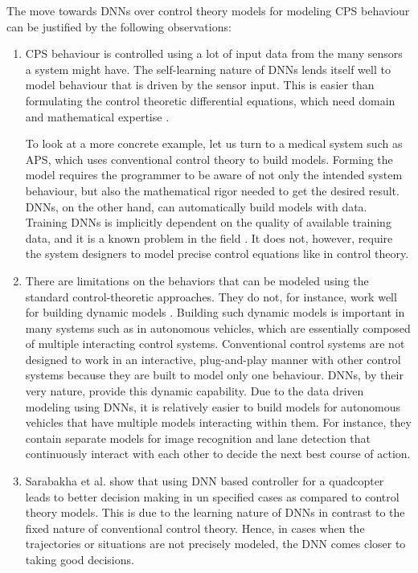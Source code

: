 The move towards DNNs over control theory models for modeling \ac{CPS} behaviour can be justified by the following observations:
\begin{enumerate}
	\item CPS behaviour is controlled using a lot of input data from the many sensors a system might have. The self-learning nature of DNNs lends itself well to model behaviour that is driven by the sensor input. This is easier than formulating the control theoretic differential equations, which need domain and mathematical expertise \cite{Aamir_2013}.
	
	
	To look at a more concrete example, let us turn to a medical system such as \ac{APS}, which uses conventional control theory to build models. 
	Forming the model requires the programmer to be aware of not only the intended system behaviour, but also the mathematical rigor needed to get the desired result. 
	DNNs, on the other hand, can automatically build models with data.
	Training DNNs is implicitly dependent on the quality of available training data, and it is a known problem in the field \cite{jabbar2015methods}. It does not, however, require the system designers to model precise control equations like in control theory.
	\item  There are limitations on the behaviors that can be modeled using the standard control-theoretic approaches. They do not, for instance, work well for building dynamic models \cite{article23}. Building such dynamic models is important in many systems such as in autonomous vehicles, which are essentially composed of multiple interacting control systems. Conventional control systems are not designed to work in an interactive, plug-and-play manner with other control systems because they are built to model only one behaviour. DNNs, by their very nature,  provide this dynamic capability. 
	Due to the data driven modeling using DNNs, it is relatively easier to build models for autonomous vehicles that have multiple models interacting within them.
	For instance, they contain separate models for image recognition and lane detection that continuously interact with each other to decide the next best course of action.
	
	\item Sarabakha et al. \cite{sarabakha2019online} show that using \ac{DNN} based controller for a quadcopter leads to better decision making in un specified cases as compared to control theory models.
	This is due to the learning nature of \ac{DNN}s in contrast to the fixed nature of conventional control theory. 
	Hence, in cases when the trajectories or situations are not precisely modeled, the \ac{DNN} comes closer to taking good decisions.
\end{enumerate}




